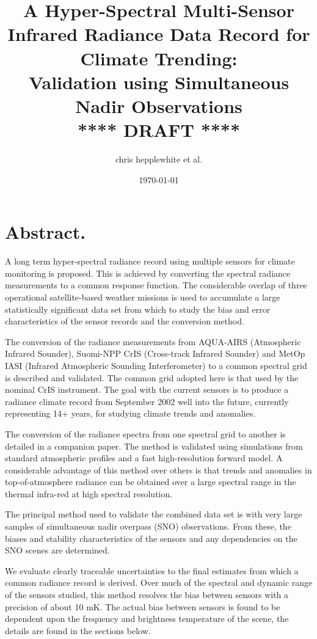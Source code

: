 \documentclass[twocolumn,10pt]{article}
\author{chris hepplewhite et al.}
\date{\today}
\title{A Hyper-Spectral Multi-Sensor Infrared Radiance Data Record for Climate Trending: \\  
  Validation using Simultaneous Nadir Observations \\  
  \vspace{3mm}
  {****} DRAFT {****}\\
}
\begin{document}
\maketitle


\section{Abstract.}

A long term hyper-spectral radiance record using multiple sensors for climate monitoring is proposed. This is achieved by converting the spectral radiance measurements to a common response function. The considerable overlap of three operational satellite-based weather missions is used to accumulate a large statistically significant data set from which to study the bias and error characteristics of the sensor records and the conversion method.

The conversion of the radiance measurements from AQUA-AIRS (Atmospheric Infrared Sounder), Suomi-NPP CrIS (Cross-track Infrared Sounder) and MetOp IASI (Infrared Atmospheric Sounding Interferometer) to a common spectral grid is described and validated. The common grid adopted here is that used by the nominal CrIS instrument. The goal with the current sensors is to produce a radiance climate record from September 2002 well into the future, currently representing 14+ years, for studying climate trends and anomalies.

The conversion of the radiance spectra from one spectral grid to another is detailed in a companion paper. The method is validated using simulations from standard atmospheric profiles and a fast high-resolution forward model. A considerable advantage of this method over others is that trends and anomalies in top-of-atmosphere radiance can be obtained over a large spectral range in the thermal infra-red at high spectral resolution.

The principal method used to validate the combined data set is with very large samples of simultaneous nadir overpass (SNO) observations. From these, the biases and stability characteristics of the sensors and any dependencies on the SNO scenes are determined.

We evaluate clearly traceable uncertainties to the final estimates from which a common radiance record is derived. Over much of the spectral and dynamic range of the sensors studied, this method resolves the bias between sensors with a precision of about 10 mK. The actual bias between sensors is found to be dependent upon the frequency and brightness temperature of the scene, the details are found in the sections below.
\end{document}
